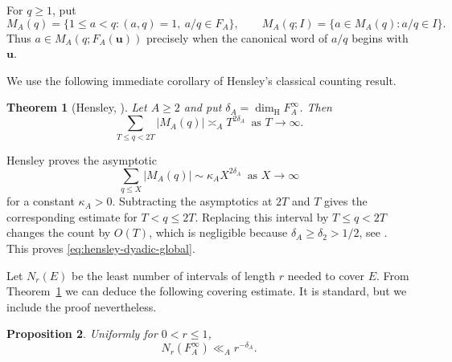 \documentclass[11pt]{amsart}
\newtheorem{theorem}{Theorem}[section]
\newtheorem{proposition}[theorem]{Proposition}
\newcommand{\dimH}{\dim_{\mathrm H}}
\begin{document}
For $q\ge1$, put
$$
 M_A(q)=\{1\le a<q:(a,q)=1,\ a/q\in F_A\},
 \qquad
 M_A(q;I)=\{a\in M_A(q):a/q\in I\}.
$$
Thus $a\in M_A(q;F_A(\mathbf{u}))$ precisely when the canonical word of $a/q$
begins with $\mathbf{u}$.

We use the following immediate corollary of Hensley's classical counting result.

\begin{theorem}[Hensley, \cite{Hensley1990}]\label{thm:hensley}
Let $A\ge2$ and put $\delta_A=\dimH F_A^\infty$.  Then
\begin{equation}\label{eq:hensley-dyadic-global}
 \sum_{T\le q<2T}|M_A(q)|\asymp_A T^{2\delta_A}
 \,\text{ as }T\to\infty.
\end{equation}
\end{theorem}


Hensley proves the asymptotic
$$
 \sum_{q\le X}|M_A(q)|\sim \kappa_A X^{2\delta_A}
 \,\text{ as }X\to\infty
$$
for a constant $\kappa_A>0$. Subtracting the asymptotics at $2T$ and $T$
gives the corresponding estimate for $T<q\le2T$.  Replacing this interval by
$T\le q<2T$ changes the count by $O(T)$, which is negligible because
$\delta_A\ge\delta_2>1/2$, see \cite{Hensley1989}.  This proves
\eqref{eq:hensley-dyadic-global}.

Let $N_r(E)$ be the least number of intervals of length $r$ needed to cover $E$. From Theorem~\ref{thm:hensley} we can deduce the following covering estimate. It is standard, but we include the proof nevertheless.

\begin{proposition}\label{prop:FA-global-cover}
Uniformly for $0<r\le1$,
\begin{equation}\label{eq:FA-global-cover}
 N_r(F_A^\infty)\ll_A r^{-\delta_A}.
\end{equation}
\end{proposition}
\end{document}
